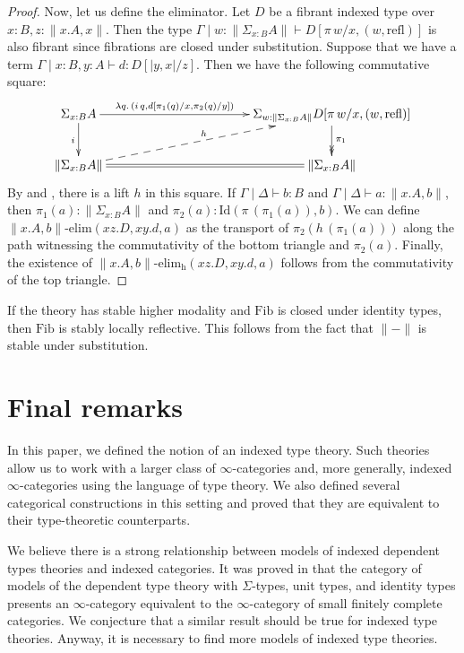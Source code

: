 \documentclass[reqno]{mscs}
\newcommand{\ob}{}
\newcommand{\fs}[1]{\mathrm{#1}}
\newcommand{\Id}{\fs{Id}}
\newcommand{\Fib}{\fs{Fib}}
\numberwithin{figure}{section}
\begin{document}
\begin{proof}
Now, let us define the eliminator.
Let $D$ be a fibrant indexed type over $x : B, z : \| x.A, x \|$.
Then the type $\Gamma \mid w : \| \Sigma_{x : B} A \| \vdash D[\pi\,w/x, (w,\fs{refl})] \ob$ is also fibrant since fibrations are closed under substitution.
Suppose that we have a term $\Gamma \mid x : B, y : A \vdash d : D[|y,x|/z]$.
Then we have the following commutative square:
\[ \xymatrix{ \Sigma_{x : B} A \ar[rrrr]^-{\lambda q.\,(i\,q, d[\pi_1(q)/x, \pi_2(q)/y])} \ar[d]_i  & & & & \Sigma_{w : \| \Sigma_{x : B} A \|} D[\pi\,w/x, (w,\fs{refl})] \ar@{->>}[d]^{\pi_1} \\
              \| \Sigma_{x : B} A \| \ar@{=}[rrrr] \ar@{-->}[urrrr]^h                               & & & & \| \Sigma_{x : B} A \|
            } \]
By  and , there is a lift $h$ in this square.
If $\Gamma \mid \Delta \vdash b : B$ and $\Gamma \mid \Delta \vdash a : \| x.A, b \|$, then $\pi_1(a) : \| \Sigma_{x : B} A \|$ and $\pi_2(a) : \Id(\pi\,(\pi_1(a)), b)$.
We can define $\| x.A, b \|\text{-}\fs{elim}(x z. D, x y. d, a)$ as the transport of $\pi_2(h\,(\pi_1(a)))$ along the path witnessing the commutativity of the bottom triangle and $\pi_2(a)$.
Finally, the existence of $\| x.A, b \|\text{-}\fs{elim_h}(x z. D, x y. d, a)$ follows from the commutativity of the top triangle.
\end{proof}

\begin{remark}
If the theory has stable higher modality and $\Fib$ is closed under identity types, then $\Fib$ is stably locally reflective.
This follows from the fact that $\| - \|$ is stable under substitution.
\end{remark}

\section{Final remarks}

In this paper, we defined the notion of an indexed type theory.
Such theories allow us to work with a larger class of $\infty$-categories and, more generally, indexed $\infty$-categories using the language of type theory.
We also defined several categorical constructions in this setting and proved that they are equivalent to their type-theoretic counterparts.

We believe there is a strong relationship between models of indexed dependent types theories and indexed categories.
It was proved in \cite{kapulkin-szumilo-fin-comp} that the category of models of the dependent type theory with $\Sigma$-types, unit types, and identity types presents an $\infty$-category equivalent to the $\infty$-category of small finitely complete categories.
We conjecture that a similar result should be true for indexed type theories.
Anyway, it is necessary to find more models of indexed type theories.
\end{document}
